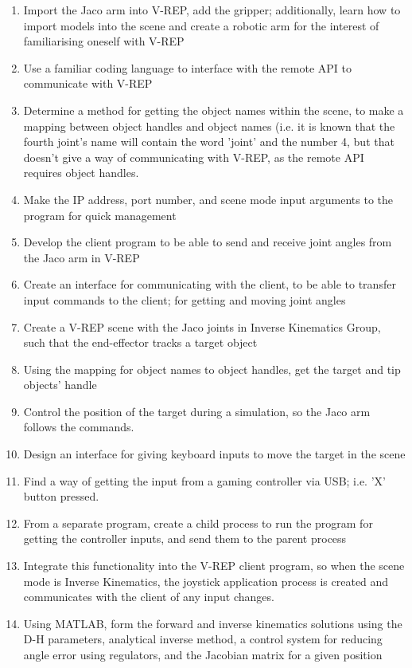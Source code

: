 \documentclass[12pt,openany,a4paper]{book}
\begin{document}
\begin{enumerate}
  \item Import the Jaco arm into V-REP, add the gripper; additionally, learn how to import models into the scene and create a robotic arm for the interest of familiarising oneself with V-REP
  \item Use a familiar coding language to interface with the remote API to communicate with V-REP
  \item Determine a method for getting the object names within the scene, to make a mapping between object handles and object names (i.e. it is known that the fourth joint's name will contain the word 'joint' and the number 4, but that doesn't give a way of communicating with V-REP, as the remote API requires object handles.
  \item Make the IP address, port number, and scene mode input arguments to the program for quick management
  \item Develop the client program to be able to send and receive joint angles from the Jaco arm in V-REP
  \item Create an interface for communicating with the client, to be able to transfer input commands to the client; for getting and moving joint angles
  \item Create a V-REP scene with the Jaco joints in Inverse Kinematics Group, such that the end-effector tracks a target object
  \item Using the mapping for object names to object handles, get the target and tip objects' handle
  \item Control the position of the target during a simulation, so the Jaco arm follows the commands.
  \item Design an interface for giving keyboard inputs to move the target in the scene
  \item Find a way of getting the input from a gaming controller via USB; i.e. 'X' button pressed.
  \item From a separate program, create a child process to run the program for getting the controller inputs, and send them to the parent process
  \item Integrate this functionality into the V-REP client program, so when the scene mode is Inverse Kinematics, the joystick application process is created and communicates with the client of any input changes.
  \item Using MATLAB, form the forward and inverse kinematics solutions using the D-H parameters, analytical inverse method, a control system for reducing angle error using regulators, and the Jacobian matrix for a given position

\end{enumerate}
\end{document}
